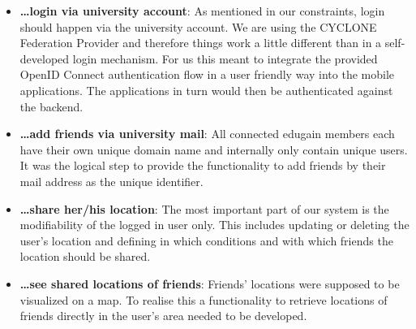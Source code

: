 \begin{itemize}
    \item \textbf{\ldots login via university account}: As mentioned in our constraints, login should happen via the university account. We are using the CYCLONE Federation Provider and therefore things work a little different than in a self-developed login mechanism. For us this meant to integrate the provided OpenID Connect authentication flow in a user friendly way into the mobile applications. The applications in turn would then be authenticated against the backend.
    \item \textbf{\ldots add friends via university mail}: All connected edugain members each have their own unique domain name and internally only contain unique users. It was the logical step to provide the functionality to add friends by their mail address as the unique identifier.
    \item \textbf{\ldots share her/his location}: The most important part of our system is the modifiability of the logged in user only. This includes updating or deleting the user's location and defining in which conditions and with which friends the location should be shared.
    \item \textbf{\ldots see shared locations of friends}: Friends' locations were supposed to be visualized on a map. To realise this a functionality to retrieve locations of friends directly in the user's area needed to be developed.
\end{itemize}